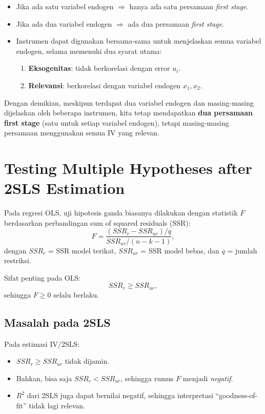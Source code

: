 \documentclass[]{article}
\begin{document}
\begin{itemize}
    \item Jika ada satu variabel endogen $\Rightarrow$ hanya ada satu persamaan \textit{first stage}.
    \item Jika ada dua variabel endogen $\Rightarrow$ ada dua persamaan \textit{first stage}.
    \item Instrumen dapat digunakan bersama-sama untuk menjelaskan semua variabel endogen, selama memenuhi dua syarat utama:
    \begin{enumerate}
        \item \textbf{Eksogenitas}: tidak berkorelasi dengan error $u_i$.
        \item \textbf{Relevansi}: berkorelasi dengan variabel endogen $x_{1}, x_{2}$.
    \end{enumerate}
\end{itemize}

Dengan demikian, meskipun terdapat dua variabel endogen dan masing-masing dijelaskan oleh beberapa instrumen, kita tetap mendapatkan \textbf{dua persamaan first stage} (satu untuk setiap variabel endogen), tetapi masing-masing persamaan menggunakan semua IV yang relevan.


\section{Testing Multiple Hypotheses after 2SLS Estimation}
 
Pada regresi OLS, uji hipotesis ganda biasanya dilakukan dengan statistik $F$ 
berdasarkan perbandingan sum of squared residuals (SSR):  
\[
F = \frac{(SSR_r - SSR_{ur})/q}{SSR_{ur}/(n-k-1)},
\]
dengan $SSR_r$ = SSR model terikat, $SSR_{ur}$ = SSR model bebas, dan $q$ = jumlah restriksi.  

Sifat penting pada OLS:
\[
SSR_r \geq SSR_{ur},
\]
sehingga $F \geq 0$ selalu berlaku.

\subsection*{Masalah pada 2SLS}
Pada estimasi IV/2SLS:
\begin{itemize}
  \item $SSR_r \geq SSR_{ur}$ tidak dijamin.
  \item Bahkan, bisa saja $SSR_r < SSR_{ur}$, sehingga rumus $F$ menjadi \emph{negatif}.
  \item $R^2$ dari 2SLS juga dapat bernilai negatif, sehingga interpretasi 
        ``goodness-of-fit'' tidak lagi relevan.
\end{itemize}
\end{document}
